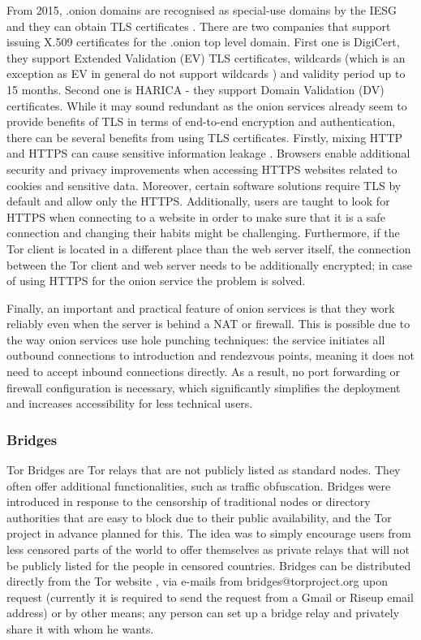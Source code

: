 From 2015, .onion domains are recognised as special-use domains by the IESG and they can obtain TLS certificates \cite{rfc-onion-domain}. There are two companies that support issuing X.509 certificates for the .onion top level domain. First one is DigiCert, they support Extended Validation (EV) TLS certificates,  wildcards (which is an exception as EV in general do not support wildcards \cite{digicert}) and validity period up to 15 months. Second one is HARICA - they support Domain Validation (DV) certificates. While it may sound redundant as the onion services already seem to provide benefits of TLS in terms of end-to-end encryption and authentication, there can be several benefits from using TLS certificates. Firstly, mixing HTTP and HTTPS can cause sensitive information leakage \cite{harica}. Browsers enable additional security and privacy improvements when accessing HTTPS websites related to cookies and sensitive data. Moreover, certain software solutions require TLS by default and allow only the HTTPS. Additionally, users are taught to look for HTTPS when connecting to a website in order to make sure that it is a safe connection and changing their habits might be challenging. Furthermore, if the Tor client is located in a different place than the web server itself, the connection between the Tor client and web server needs to be additionally encrypted; in case of using HTTPS for the onion service the problem is solved.

Finally, an important and practical feature of onion services is that they work reliably even when the server is behind a NAT or firewall. This is possible due to the way onion services use hole punching techniques: the service initiates all outbound connections to introduction and rendezvous points, meaning it does not need to accept inbound connections directly. As a result, no port forwarding or firewall configuration is necessary, which significantly simplifies the deployment and increases accessibility for less technical users.

\subsubsection{Bridges}
Tor Bridges are Tor relays that are not publicly listed as standard nodes. They often offer additional functionalities, such as traffic obfuscation. Bridges were introduced in response to the censorship of traditional nodes or directory authorities that are easy to block due to their public availability, and the Tor project in advance planned for this. The idea was to simply encourage users from less censored parts of the world to offer themselves as private relays that will not be publicly listed for the people in censored countries.
Bridges can be distributed directly from the Tor website \cite{tor-bridges}, via e-mails from bridges@torproject.org upon request (currently it is required to send the request from a Gmail or Riseup email address) or by other means; any person can set up a bridge relay and privately share it with whom he wants.

